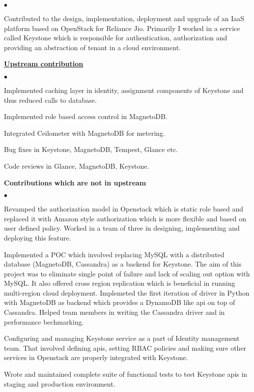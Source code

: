\documentclass[11pt]{article}
\begin{document}
{\small

\noindent
\begin{list}{$\bullet$}{
}
\item Contributed to the design, implementation, deployment and upgrade of an IaaS platform based on OpenStack for Reliance Jio. Primarily I worked in a service called Keystone which is responsible for authentication, authorization and providing an abstraction of tenant in a cloud environment.

\item \href{http://stackalytics.com/?release=all&user_id=ajayaa}{\textbf{Upstream contribution}}
\begin{list}{$\bullet$}{
}
\item Implemented caching layer in identity, assignment components of Keystone and thus reduced calls to database.
\item Implemented role based access control in MagnetoDB.
\item Integrated Ceilometer with MagnetoDB for metering.
\item Bug fixes in Keystone, MagnetoDB, Tempest, Glance etc.
\item Code reviews in Glance, MagnetoDB, Keystone.
\end{list}
\item {\textbf{Contributions which are not in upstream}}
\begin{list}{$\bullet$}{
}
\item  Revamped the authorization model in Openstack which is static role based and replaced it with Amazon style authorization which is more flexible and based on user defined policy. Worked in a team of three in designing, implementing and deploying this feature.

\item Implemented a POC which involved replacing MySQL with a distributed database (MagnetoDB, Cassandra) as a backend for Keystone. The aim of this project was to eliminate single point of failure and lack of scaling out option with MySQL. It also offered cross region replication which is beneficial in running multi-region cloud deployment. Implemeted the first iteration of driver in Python with MagnetoDB as backend which provides a DynamoDB like api on top of Cassandra. Helped team members in writing the Cassandra driver and in performance bechmarking.

\item Configuring and managing Keystone service as a part of Identity management team. That involved defining apis, setting RBAC policies and making sure other services in Openstack are properly integrated with Keystone.

\item Wrote and maintained complete suite of functional tests to test Keystone apis in staging and production environment.

\end{list}
\end{list}
}
\end{document}
